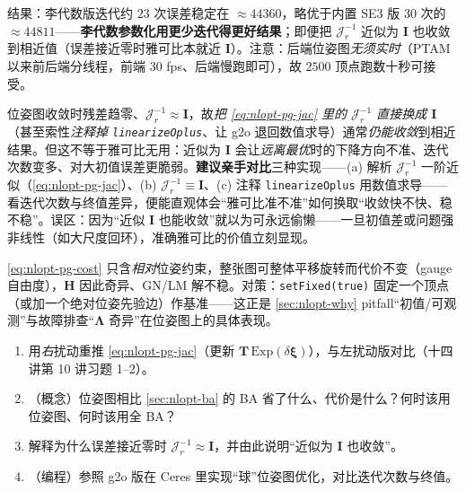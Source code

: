 \noindent 结果：李代数版迭代约 $23$ 次误差稳定在 $\approx44360$，略优于内置 SE3 版 $30$ 次的 $\approx44811$——\textbf{李代数参数化用更少迭代得更好结果}；即便把 $\boldsymbol{\mathcal{J}}_r^{-1}$ 近似为 $\mathbf{I}$ 也收敛到相近值（误差接近零时雅可比本就近 $\mathbf{I}$）。注意：后端位姿图\emph{无须实时}（PTAM 以来前后端分线程，前端 $30$ fps、后端慢跑即可），故 $2500$ 顶点跑数十秒可接受。

\begin{pitfall}
位姿图收敛时残差趋零、$\boldsymbol{\mathcal{J}}_r^{-1}\approx\mathbf{I}$，故\emph{把 \cref{eq:nlopt-pg-jac} 里的 $\boldsymbol{\mathcal{J}}_r^{-1}$ 直接换成 $\mathbf{I}$}（甚至索性\emph{注释掉 \texttt{linearizeOplus}}、让 g2o 退回数值求导）通常\emph{仍能收敛}到相近结果。但这不等于雅可比无用：近似为 $\mathbf{I}$ 会让\emph{远离最优}时的下降方向不准、迭代次数变多、对大初值误差更脆弱。\textbf{建议亲手对比}三种实现——(a) 解析 $\boldsymbol{\mathcal{J}}_r^{-1}$ 一阶近似（\cref{eq:nlopt-pg-jac}）、(b) $\boldsymbol{\mathcal{J}}_r^{-1}\equiv\mathbf{I}$、(c) 注释 \texttt{linearizeOplus} 用数值求导——看迭代次数与终值差异，便能直观体会“雅可比准不准”如何换取“收敛快不快、稳不稳”\cite{gaoxiang2019slam14}。误区：因为“近似 $\mathbf{I}$ 也能收敛”就以为可永远偷懒——一旦初值差或问题强非线性（如大尺度回环），准确雅可比的价值立刻显现。
\end{pitfall}

\begin{pitfall}
\cref{eq:nlopt-pg-cost} 只含\emph{相对}位姿约束，整张图可整体平移旋转而代价不变（gauge 自由度），$\mathbf{H}$ 因此奇异、GN/LM 解不稳。对策：\texttt{setFixed(true)} 固定一个顶点（或加一个绝对位姿先验边）作基准——这正是 \cref{sec:nlopt-why} pitfall“初值/可观测”与故障排查“$\boldsymbol{\Lambda}$ 奇异”在位姿图上的具体表现。
\end{pitfall}

\begin{practice}
\begin{enumerate}
  \item 用\emph{右}扰动重推 \cref{eq:nlopt-pg-jac}（更新 $\mathbf{T}\,\mathrm{Exp}(\delta\boldsymbol{\xi})$），与左扰动版对比（十四讲第 10 讲习题 1--2）。
  \item （概念）位姿图相比 \cref{sec:nlopt-ba} 的 BA 省了什么、代价是什么？何时该用位姿图、何时该用全 BA？
  \item 解释为什么误差接近零时 $\boldsymbol{\mathcal{J}}_r^{-1}\approx\mathbf{I}$，并由此说明“近似为 $\mathbf{I}$ 也收敛”。
  \item （编程）参照 g2o 版在 Ceres 里实现“球”位姿图优化，对比迭代次数与终值。
\end{enumerate}
\end{practice}

